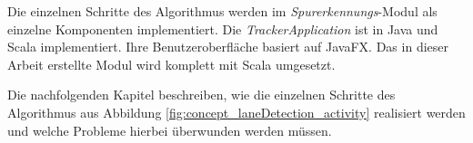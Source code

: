 Die einzelnen Schritte des Algorithmus werden im \textit{Spurerkennungs}-Modul als einzelne Komponenten
implementiert.
Die \textit{TrackerApplication} ist in Java und Scala implementiert. Ihre Benutzeroberfläche basiert
auf JavaFX. Das in dieser Arbeit erstellte Modul wird komplett mit Scala umgesetzt.

Die nachfolgenden Kapitel beschreiben, wie die einzelnen Schritte des Algorithmus aus
Abbildung \ref{fig:concept_laneDetection_activity} realisiert werden und welche Probleme hierbei
überwunden werden müssen.